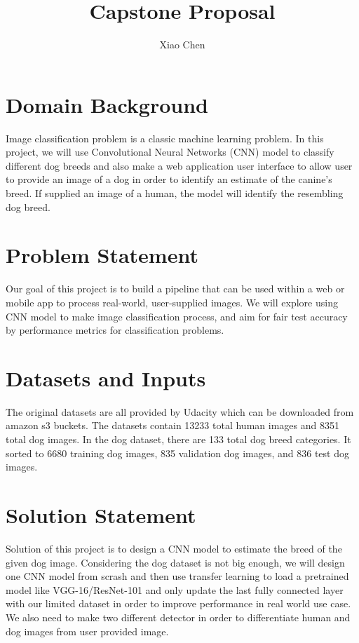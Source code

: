 \documentclass{article}
\begin{document}
\title{
    \textbf{Capstone Proposal}
}
\author{Xiao Chen}

\maketitle
\newpage

\section{Domain Background}
Image classification problem is a classic machine learning problem. In this project, we will use Convolutional Neural Networks (CNN) model to classify different dog breeds and also make a web application user interface to allow user to provide an image of a dog in order to identify an estimate of the canine’s breed. If supplied an image of a human, the model will identify the resembling dog breed.


\section{Problem Statement}
Our goal of this project is to build a pipeline that can be used within a web or mobile app to process real-world, user-supplied images. We will explore using CNN model to make image classification process, and aim for fair test accuracy by performance metrics for classification problems.

\section{Datasets and Inputs}
The original datasets are all provided by Udacity which can be downloaded from amazon s3 buckets.
The datasets contain 13233 total human images and 8351 total dog images.
In the dog dataset, there are 133 total dog breed categories. It sorted to 6680 training dog images, 835 validation dog images, and 836 test dog images.

\section{Solution Statement}
Solution of this project is to design a CNN model to estimate the breed of the given dog image. Considering the dog dataset is not big enough, we will design one CNN model from scrash and then use transfer learning to load a pretrained model like VGG-16/ResNet-101 and only update the last fully connected layer with our limited dataset in order to improve performance in real world use case. We also need to make two different detector in order to differentiate human and dog images from user provided image.
\end{document}
